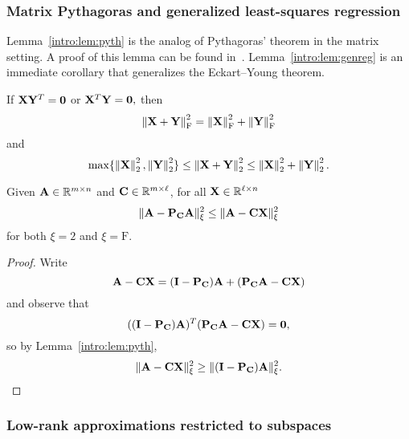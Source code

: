 \subsubsection{Matrix Pythagoras and generalized least-squares regression}
Lemma~\ref{intro:lem:pyth} is the analog of Pythagoras' theorem in the matrix 
setting. A proof of this lemma can be found in~\cite{BDM11a}. 
Lemma~\ref{intro:lem:genreg} is an immediate corollary that generalizes the 
Eckart--Young theorem.
\begin{lemma}\label{intro:lem:pyth}
If $\mathbf{X}\mathbf{Y}^T=\bm{0}$ or $\mathbf{X}^T\mathbf{Y}=\bm{0},$ then 
%
\[
\left\|\mathbf{X}+\mathbf{Y}\right\|_\mathrm{F}^2 = \left\|\mathbf{X}\right\|_\mathrm{F}^2+\left\|\mathbf{Y}\right\|_\mathrm{F}^2
\]
and
\[
\max\{\left\|\mathbf{X}\right\|_2^2, \left\|\mathbf{Y}\right\|_2^2\} \leq \left\|\mathbf{X} + \mathbf{Y}\right\|_2^2 \leq 
\left\|\mathbf{X}\right\|_2^2 + \left\|\mathbf{Y}\right\|_2^2.
\]
\end{lemma}

\begin{lemma}\label{intro:lem:genreg}
Given $\mathbf{A} \in \mathbb{R}^{m \times n}$ and $\mathbf{C} \in \mathbb{R}^{m \times \ell}$, for all 
$\mathbf{X} \in\mathbb{R}^{\ell \times n}$ 
\[
\mbox{}\| \mathbf{A}- \mathbf{P}_{\mathbf{C}} \mathbf{A}\|_{\xi}^2 \le \mbox{}\| \mathbf{A} - \mathbf{C} \mathbf{X} \|_{\xi}^2
\]
for both $\xi = 2$ and $\xi = \mathrm{F}$.
\end{lemma}
\begin{proof}
Write
\[
\mathbf{A}-\mathbf{C}\mathbf{X}=(\mathbf{I}-\mathbf{P}_{\mathbf{C}})\mathbf{A} + (\mathbf{P}_{\mathbf{C}} \mathbf{A}- \mathbf{C}\mathbf{X})
\]
and observe that 
\[
 ((\mathbf{I}-\mathbf{P}_{\mathbf{C}})\mathbf{A})^T (\mathbf{P}_{\mathbf{C}} \mathbf{A}- \mathbf{C}\mathbf{X}) = 
 \bm{0},
\]
so by Lemma~\ref{intro:lem:pyth},
\[ 
 \mbox{}\|\mathbf{A}-\mathbf{C}\mathbf{X}\|_{\xi}^2 \ge
\mbox{}\|(\mathbf{I}-\mathbf{P}_{\mathbf{C}})\mathbf{A}\|_{\xi}^2.
\]
\end{proof}

\subsubsection{Low-rank approximations restricted to subspaces}

